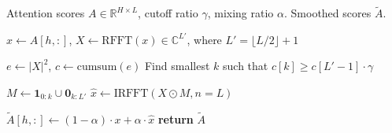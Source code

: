 \begin{algorithm}[tb]
   \caption{Spectral Attention Smoothing (SAS)}
   \label{alg:sas}
\begin{algorithmic}[1]
    Attention scores $A \in \mathbb{R}^{H \times L}$, cutoff ratio $\gamma$, mixing ratio $\alpha$.
    Smoothed scores $\tilde{A}$.
   
      \STATE $x \gets A[h,:]$, $X \gets \text{RFFT}(x) \in \mathbb{C}^{L'}$, where $L' = \lfloor L/2 \rfloor + 1$
      
      \STATE {}
      \STATE $e \gets |X|^2$, $c \gets \text{cumsum}(e)$
      \STATE Find smallest $k$ such that $c[k] \ge c[L'-1] \cdot \gamma$
      
      \STATE {}
      \STATE $M \gets \mathbf{1}_{0:k} \cup \mathbf{0}_{k:L'}$ 
      \STATE $\hat{x} \gets \text{IRFFT}(X \odot M, n=L)$
      
      \STATE {}
      \STATE $\tilde{A}[h,:] \gets (1 - \alpha) \cdot x + \alpha \cdot \hat{x}$
   \ENDFOR
   \STATE \textbf{return} $\tilde{A}$
\end{algorithmic}
\end{algorithm}
